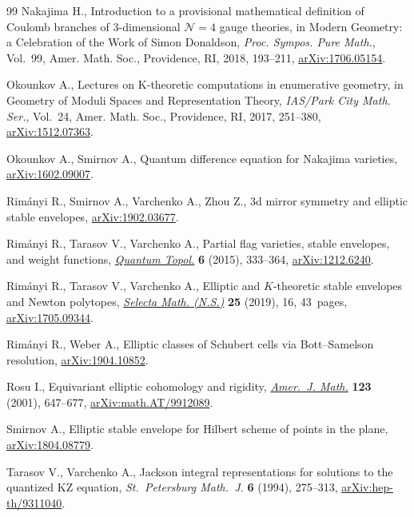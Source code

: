 \documentclass[10pt,a4paper]{amsart}
\numberwithin{equation}{section}
\begin{document}
\begin{thebibliography}{99}
Nakajima H., Introduction to a provisional mathematical definition of {C}oulomb
 branches of 3-dimensional {${\mathcal N}=4$} gauge theories, in Modern
 Geometry: a Celebration of the Work of {S}imon {D}onaldson, \textit{Proc.
 Sympos. Pure Math.}, Vol.~99, Amer. Math. Soc., Providence, RI, 2018,
 193--211, \href{https://arxiv.org/abs/1706.05154}{arXiv:1706.05154}.

Okounkov A., Lectures on {K}-theoretic computations in enumerative geometry, in
 Geometry of Moduli Spaces and Representation Theory, \textit{IAS/Park City
 Math. Ser.}, Vol.~24, Amer. Math. Soc., Providence, RI, 2017, 251--380,
 \href{https://arxiv.org/abs/1512.07363}{arXiv:1512.07363}.

Okounkov A., Smirnov A., Quantum difference equation for Nakajima varieties,
 \href{https://arxiv.org/abs/1602.09007}{arXiv:1602.09007}.

Rim\'anyi R., Smirnov A., Varchenko A., Zhou Z., 3d mirror symmetry and
 elliptic stable envelopes, \href{https://arxiv.org/abs/1902.03677}{arXiv:1902.03677}.

Rim\'anyi R., Tarasov V., Varchenko A., Partial flag varieties, stable
 envelopes, and weight functions, \href{https://doi.org/10.4171/QT/65}{\textit{Quantum Topol.}} \textbf{6} (2015),
 333--364, \href{https://arxiv.org/abs/1212.6240}{arXiv:1212.6240}.

Rim\'anyi R., Tarasov V., Varchenko A., Elliptic and {$K$}-theoretic stable
 envelopes and {N}ewton polytopes, \href{https://doi.org/10.1007/s00029-019-0451-5}{\textit{Selecta Math. (N.S.)}} \textbf{25}
 (2019), 16, 43~pages, \href{https://arxiv.org/abs/1705.09344}{arXiv:1705.09344}.

Rim\'anyi R., Weber A., Elliptic classes of {S}chubert cells via
 {B}ott--{S}amelson resolution, \href{https://arxiv.org/abs/1904.10852}{arXiv:1904.10852}.

Rosu I., Equivariant elliptic cohomology and rigidity, \href{https://doi.org/10.1353/ajm.2001.0027}{\textit{Amer.~J. Math.}}
 \textbf{123} (2001), 647--677, \href{https://arxiv.org/abs/math.AT/9912089}{arXiv:math.AT/9912089}.

Smirnov A., Elliptic stable envelope for Hilbert scheme of points in the plane,
 \href{https://arxiv.org/abs/1804.08779}{arXiv:1804.08779}.

Tarasov V., Varchenko A., Jackson integral representations for solutions to the
 quantized KZ equation, \textit{St.~Petersburg Math.~J.} \textbf{6} (1994),
 275--313, \href{https://arxiv.org/abs/hep-th/9311040}{arXiv:hep-th/9311040}.


\end{thebibliography}
\end{document}
